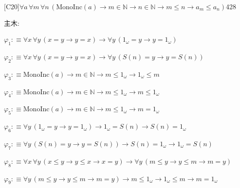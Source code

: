 \begin{fullproof}{[C20]}{$\forall a\,\forall m\,\forall n\,(\mathrm{MonoInc}(a) \to m \in \mathbb{N} \to n \in \mathbb{N} \to m \leq n \to a_{m} \leq a_{n})$}{428}
\begin{ptree}
\noLine
{}
\end{ptree}
\noindent 主木:
\begin{ptree}
\noLine
{}
\end{ptree}
\begin{abbrevlist}
\item $\varphi_{1} :\equiv \forall x\,\forall y\,(x = y \to y = x) \to \forall y\,(1_{\omega} = y \to y = 1_{\omega})$
\item $\varphi_{2} :\equiv \forall x\,\forall y\,(x = y \to y = x) \to \forall y\,(S(n) = y \to y = S(n))$
\item $\varphi_{3} :\equiv \mathrm{MonoInc}(a) \to m \in \mathbb{N} \to m \leq 1_{\omega} \to 1_{\omega} \leq m$
\item $\varphi_{4} :\equiv \mathrm{MonoInc}(a) \to m \in \mathbb{N} \to m \leq 1_{\omega} \to m \leq 1_{\omega}$
\item $\varphi_{5} :\equiv \mathrm{MonoInc}(a) \to m \in \mathbb{N} \to m \leq 1_{\omega} \to m = 1_{\omega}$
\item $\varphi_{6} :\equiv \forall y\,(1_{\omega} = y \to y = 1_{\omega}) \to 1_{\omega} = S(n) \to S(n) = 1_{\omega}$
\item $\varphi_{7} :\equiv \forall y\,(S(n) = y \to y = S(n)) \to S(n) = 1_{\omega} \to 1_{\omega} = S(n)$
\item $\varphi_{8} :\equiv \forall x\,\forall y\,(x \leq y \to y \leq x \to x = y) \to \forall y\,(m \leq y \to y \leq m \to m = y)$
\item $\varphi_{9} :\equiv \forall y\,(m \leq y \to y \leq m \to m = y) \to m \leq 1_{\omega} \to 1_{\omega} \leq m \to m = 1_{\omega}$

\end{abbrevlist}
\end{fullproof}
